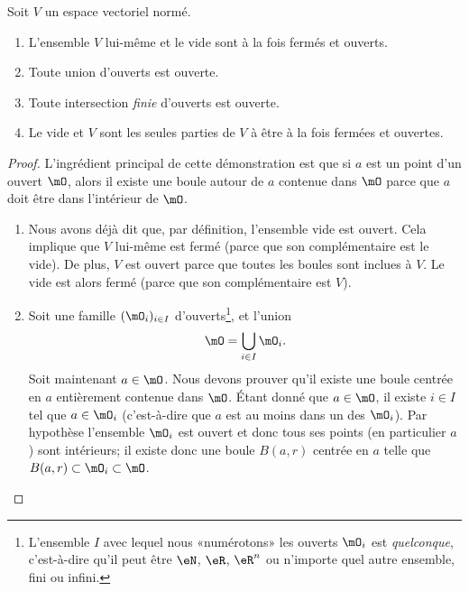 \begin{proposition}		\label{PropTopologieAx}
	Soit $V$ un espace vectoriel normé.
	\begin{enumerate}
		\item
		      L'ensemble $V$ lui-même et le vide sont à la fois fermés et ouverts.
		\item
		      Toute union d'ouverts est ouverte.
		\item
		      Toute intersection \emph{finie} d'ouverts est ouverte.
		\item		\label{ItemPropTopologieAxiv}
		      Le vide et $V$ sont les seules parties de $V$ à être à la fois fermées et ouvertes.
	\end{enumerate}
\end{proposition}

\begin{proof}
	L'ingrédient principal de cette démonstration est que si $a$ est un point d'un ouvert $\mO$, alors il existe une boule autour de $a$ contenue dans $\mO$ parce que $a$ doit être dans l'intérieur de $\mO$.
	\begin{enumerate}

		\item
		      Nous avons déjà dit que, par définition, l'ensemble vide est ouvert. Cela implique que $V$ lui-même est fermé (parce que son complémentaire est le vide). De plus, $V$ est ouvert parce que toutes les boules sont inclues à $V$. Le vide est alors fermé (parce que son complémentaire est $V$).
		\item
		      Soit une famille $(\mO_i)_{i\in I}$ d'ouverts\footnote{L'ensemble $I$ avec lequel nous «numérotons» les ouverts $\mO_i$ est \emph{quelconque}, c'est-à-dire qu'il peut être $\eN$, $\eR$, $\eR^n$ ou n'importe quel autre ensemble, fini ou infini.}, et l'union
		      \begin{equation}
			      \mO=\bigcup_{i\in I}\mO_i.
		      \end{equation}
		      Soit maintenant $a\in\mO$. Nous devons prouver qu'il existe une boule centrée en $a$ entièrement contenue dans $\mO$. Étant donné que $a\in\mO$, il existe $i\in I$ tel que $a\in\mO_i$ (c'est-à-dire que $a$ est au moins dans un des $\mO_i$). Par hypothèse l'ensemble $\mO_i$ est ouvert et donc tous ses points (en particulier $a$) sont intérieurs; il existe donc une boule $B(a,r)$ centrée en $a$ telle que $B(a,r)\subset\mO_i\subset\mO$.


\end{enumerate}
\end{proof}
